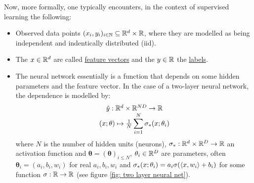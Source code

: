 \documentclass{article}
\begin{document}
Now, more formally, one typically encounters, in the context of supervised learning the following: 
\begin{itemize}
	\item Observed data points $ (x_{i},y_{i})_{i\in \mathbb{N}}\subseteq \mathbb{R}^{d}\times \mathbb{R}$, where they are modelled as being independent and indentically distributed (iid).
	\item The $ x\in \mathbb{R}^{d}$ are called \underline{feature vectors} and the $ y\in \mathbb{R}$ the \underline{labels}.
	\item The neural network essentially is a function that depends on some hidden parameters and the feature vector. In the case of a two-layer neural network, the dependence is modelled by: 
		\begin{equation}\label{eq: neural net def}
			\begin{array}{cc}
			\hat{y}:\mathbb{R}^{d}\times \mathbb{R}^{ND}\to \mathbb{R}   \\
			(x;\mathbf{\theta})\mapsto \frac{1}{N}\displaystyle\sum^{N}_{i=1}\sigma_{*}(x;\mathbf{\theta}_{i})     
	     \end{array}
     \end{equation}
		where $ N$ is the number of hidden units (neurons), $ \sigma_{*}:\mathbb{R}^{d}\times\mathbb{R}^{D}\to \mathbb{R}$ an activation function and $\mathbf{\theta} = (\mathbf{\theta})_{i\leq N}$, $\mathbf{\theta}_{i}\in \mathbb{R}^{D}$ are parameters, often $\mathbf{\theta}_{i} = (a_{i}, b_{i}, w_{i})$ for real $ a_{i}, b_{i}, w_{i}$ and $ \sigma_{*}(x;\mathbf{\theta}_{i})=a_{i}\sigma(\langle x, w_{i}\rangle+b_{i})$ for some function $ \sigma:\mathbb{R}\to \mathbb{R}$ (see figure \ref{fig: two layer neural net}).
\end{itemize}
\end{document}
